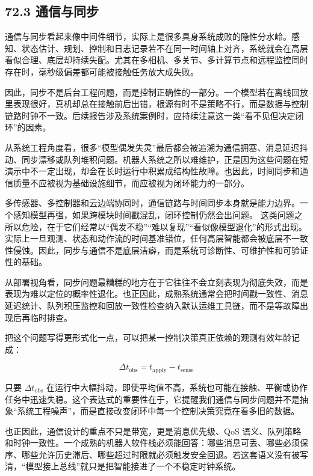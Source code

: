 \subsection*{72.3 通信与同步}


通信与同步看起来像中间件细节，实际上是很多具身系统成败的隐性分水岭。感知、状态估计、规划、控制和日志记录若不在同一时间轴上对齐，系统就会在高层看似合理、底层却持续失配。尤其在多相机、多关节、多计算节点和远程监控同时存在时，毫秒级偏差都可能被接触任务放大成失败。

因此，同步不是后台工程问题，而是控制正确性的一部分。一个模型若在离线回放里表现很好，真机却总在接触前后出错，根源有时不是策略不行，而是数据与控制链路时钟不一致。后续报告涉及系统案例时，应持续注意这一类“看不见但决定闭环”的因素。

从系统工程角度看，很多“模型偶发失灵”最后都会被追溯为通信拥塞、消息延迟抖动、同步漂移或队列堆积问题。机器人系统之所以难维护，正是因为这些问题在短演示中不一定出现，却会在长时运行中积累成结构性故障。也因此，时间同步和通信质量不应被视为基础设施细节，而应被视为闭环能力的一部分。

多传感器、多控制器和云边端协同时，通信链路与时间同步本身就是能力边界。一个感知模型再强，如果跨模块时间戳混乱，闭环控制仍然会出问题。 这类问题之所以危险，在于它们经常以“偶发不稳”“难以复现”“看似像模型退化”的形式出现。实际上一旦观测、状态和动作流的时间基准错位，任何高层智能都会被底层不一致性侵蚀。因此，同步与通信不是底层洁癖，而是系统可诊断性、可维护性和可验证性的基础。

从部署视角看，同步问题最糟糕的地方在于它往往不会立刻表现为彻底失效，而是表现为难以定位的概率性退化。也正因此，成熟系统通常会把时间戳一致性、消息延迟统计、队列积压监控和回放一致性检查纳入默认运维工具链，而不是等故障出现后再临时排查。

把这个问题写得更形式化一点，可以把某一控制决策真正依赖的观测有效年龄记成：

\begingroup
\footnotesize
\begin{equation*}
\Delta t_{\text{obs}} = t_{\text{apply}} - t_{\text{sense}}
\end{equation*}
\endgroup

只要 \(\Delta t_{\text{obs}}\) 在运行中大幅抖动，即使平均值不高，系统也可能在接触、平衡或协作任务中迅速失稳。这个表达式的重要性在于，它提醒我们通信与同步问题并不是抽象“系统工程噪声”，而是直接改变闭环中每一个控制决策究竟在看多旧的数据。

也正因此，通信设计的重点不只是带宽，更是消息优先级、QoS 语义、队列策略和时钟一致性。一个成熟的机器人软件栈必须能回答：哪些消息可丢、哪些必须保序、哪些允许历史滞后、哪些超过时限就必须触发安全回退。若这套语义没有被写清，“模型接上总线”就只是把智能接进了一个不稳定时钟系统。

